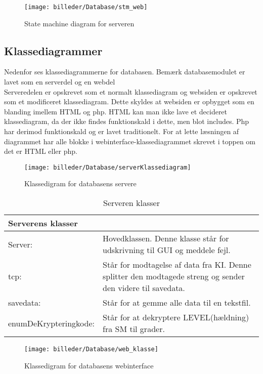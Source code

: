 \begin{figure}[H]
	\centering
	\texttt{[image: billeder/Database/stm\_web]}
	\caption{State machine diagram for serveren}
	\label{fig:stm_web}
\end{figure}

\subsection{Klassediagrammer}
Nedenfor ses klassediagrammerne for databasen. Bemærk databasemodulet er lavet som en serverdel og en webdel\\
Serveredelen er opskrevet som et normalt klassediagram og websiden er opskrevet som et modificeret klassediagram. Dette skyldes at websiden er opbygget som en blanding imellem HTML og php. HTML kan man ikke lave et decideret klassediagram, da der ikke findes funktionskald i dette, men blot includes. Php har derimod funktionskald og er lavet traditionelt. For at lette læsningen af diagrammet har alle blokke i webinterface-klassediagrammet skrevet i toppen om det er HTML eller php.

\begin{figure}[htbp]
	\centering
	\texttt{[image: billeder/Database/serverKlassediagram]}
	\caption{Klassedigram for databasens servere}
	\label{fig:serverKlassediagram}
\end{figure}

\begin{table}[H]
\centering
{}
\begin{tabular}{| p{3cm}  p{12.5cm}|}
\multicolumn{2}{l}{{\Large Serverens klasser}} \\\hline
Server:&Hovedklassen. Denne klasse står for udskrivning til GUI og meddele fejl.\\\hline
tcp:& Står for modtagelse af data fra KI. Denne splitter den modtagede streng og sender den videre til savedata.\\\hline
savedata: & Står for at gemme alle data til en tekstfil.\\\hline
enumDeKrypteringkode:& Står for at dekryptere LEVEL(hældning) fra SM til grader.\\\hline
\end{tabular}
\caption{Serveren klasser}
\label{tabel:server-klasser}
\end{table}

\begin{figure}[H]
	\centering
	\texttt{[image: billeder/Database/web\_klasse]}
	\caption{Klassedigram for databasens webinterface}
	\label{fig:serverKlassediagram}
\end{figure}

